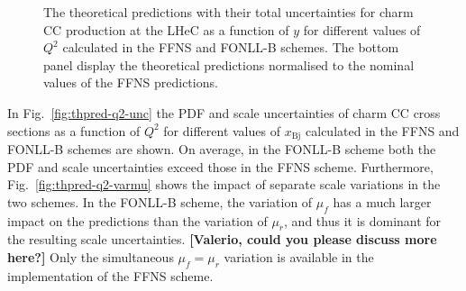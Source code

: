 \documentclass[pdftex,twocolumn,epjc3]{svjour3}          %
\newcommand{\xbj}{\ensuremath{x_{\text{Bj}}}\xspace}
\newcommand{\fonll} {{FONLL-B}\xspace}
\newcommand{\ffns} {{FFNS}\xspace}
\begin{document}
\begin{figure}
    \centering
    \caption{The theoretical predictions with their total uncertainties for charm CC production at the LHeC as a function of $y$ for different values of $Q^2$ calculated in the \ffns and \fonll schemes. The bottom panel display the theoretical predictions normalised to the nominal values of the \ffns predictions.}
    \label{fig:thpred-y}
\end{figure}

In Fig.~\ref{fig:thpred-q2-unc} the PDF and scale uncertainties of charm CC cross sections as a function of $Q^2$ for different values of \xbj calculated in the \ffns and \fonll schemes are shown. On average, in the \fonll scheme both the PDF and scale uncertainties exceed those in the \ffns scheme. Furthermore, Fig.~\ref{fig:thpred-q2-varmu} shows the impact of separate scale variations in the two schemes. In the \fonll scheme, the variation of $\mu_f$ has a much larger impact on the predictions than the variation of $\mu_r$, and thus it is dominant for the resulting scale uncertainties. {\bf [Valerio, could you please discuss more here?]} Only the simultaneous $\mu_f = \mu_r$ variation is available in the implementation of the \ffns scheme. 
\end{document}
